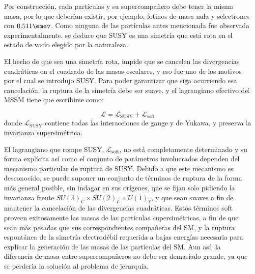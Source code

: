 Por construcción, cada partículas y su supercompañero debe tener la misma masa, por lo que deberían existir, por ejemplo, fotinos de masa nula y selectrones con $0.511 \emev$. Como ninguna de las partículas antes mencionada fue observada experimentalmente, se deduce que SUSY es una simetría que está rota en el estado de vacío elegido por la naturaleza.

El hecho de que sea una simetría rota, impide que se cancelen las divergencias cuadráticas en el cuadrado de las masas escalares, y eso fue uno de los motivos por el cual se introdujo SUSY. Para poder garantizar que siga ocurriendo esa cancelación, la ruptura de la simetría debe ser suave, y el lagrangiano efectivo del MSSM tiene que escribirse como:

\begin{equation}
\mathcal{L}=\mathcal{L}_{\text{SUSY}}+\mathcal{L}_{\text{soft}}
\end{equation}
donde $\mathcal{L}_{\text{SUSY}}$ contiene todas las interacciones de gauge y de Yukawa, y preserva la invarianza supersimétrica. 







El lagrangiano que rompe SUSY, $\mathcal{L}_{\text{soft}}$, no está completamente determinado y su forma explícita así como el conjunto de parámetros involucrados dependen del mecanismo particular de ruptura de SUSY. Debido a que este mecanismo es desconocido, se puede suponer un conjunto de términos de ruptura de la forma más general posible, sin indagar en sus orígenes, que se fijan solo pidiendo la invarianza frente $SU(3)_{C}\times SU(2)_{L}\times U(1)_{Y}$, y que sean suaves a fin de mantener la cancelación de las divergencias cuadráticas. Estos términos soft proveen exitosamente las masas de las partículas supersimétricas, a fin de que sean más pesadas que sus correspondientes compañeras del SM, y la ruptura espontánea de la simetría electrodébil requerida a bajas energías necesaria para explicar la generación de las masas de las partículas del SM. Aun así, la diferencia de masa entre supercompañeros no debe ser demasiado grande, ya que se perdería la solución al problema de jerarquía.


